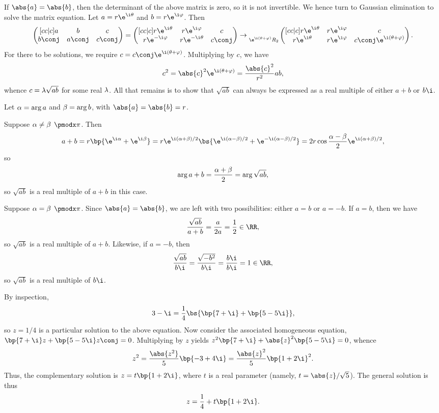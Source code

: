 \begin{solution}
\begin{ppart}
        If $\abs{a} = \abs{b}$, then the determinant of the above matrix is zero, so it is not invertible. We hence turn to Gaussian elimination to solve the matrix equation. Let $a = r\e^{\i \t}$ and $b = r\e^{\i \vf}$. Then \[\begin{pmatrix}[cc|c] a & b & c \\ b\conj & a\conj & c\conj \end{pmatrix} = \begin{pmatrix}[cc|c] r\e^{\i \t} & r\e^{\i \vf} & c \\ r\e^{-\i \vf} & r\e^{-\i \t} & c\conj \end{pmatrix} \rightarrow \begin{matrix}\\ \scriptstyle \e^{\i(\t + \vf)} R_2\end{matrix} \begin{pmatrix}[cc|c] r\e^{\i \t} & r\e^{\i \vf} & c \\ r\e^{\i \t} & r\e^{\i \vf} & c\conj \e^{\i (\t + \vf)} \end{pmatrix}.\] For there to be solutions, we require $c = c\conj \e^{\i (\t + \vf)}$. Multiplying by $c$, we have \[c^2 = \abs{c}^2 \e^{\i (\t + \vf)} = \frac{\abs{c}^2}{r^2} ab,\] whence $c = \lambda \sqrt{ab}$ for some real $\lambda$. All that remains is to show that $\sqrt{ab}$ can always be expressed as a real multiple of either $a + b$ or $b\i$.

        Let $\alpha = \arg{a}$ and $\beta = \arg{b}$, with $\abs{a} = \abs{b} = r$.

         Suppose $\a \neq \b \pmod{\pi}$. Then \[a + b = r\bp{\e^{\i \a} + \e^{\i \b}} = r\e^{\i (\a + \b)/2} \bs{\e^{\i (\a - \b)/2} + \e^{-\i(\a - \b)/2}} = 2r\cos{\frac{\a - \b}{2}}\e^{\i (\a + \b)/2},\] so \[\arg{a + b} = \frac{\alpha + \beta}{2} = \arg{\sqrt{ab}},\] so $\sqrt{ab}$ is a real multiple of $a + b$ in this case.

         Suppose $\a = \b \pmod{\pi}$. Since $\abs{a} = \abs{b}$, we are left with two possibilities: either $a = b$ or $a = -b$. If $a = b$, then we have \[\frac{\sqrt{ab}}{a + b} = \frac{a}{2a} = \frac12 \in \RR,\] so $\sqrt{ab}$ is a real multiple of $a + b$. Likewise, if $a = -b$, then \[\frac{\sqrt{ab}}{b \i} = \frac{\sqrt{-b^2}}{b \i} = \frac{b\i}{b\i} = 1 \in \RR,\] so $\sqrt{ab}$ is a real multiple of $b\i$.
    \end{ppart}
    \begin{ppart}
        By inspection, \[3-\i = \frac14 \bs{\bp{7 + \i} + \bp{5 - 5\i}},\] so $z = 1/4$ is a particular solution to the above equation. Now consider the associated homogeneous equation, $\bp{7 + \i} z + \bp{5 - 5\i} z\conj = 0$. Multiplying by $z$ yields $z^2 \bp{7 + \i} + \abs{z}^2 \bp{5 - 5\i} = 0$, whence \[z^2 = \frac{\abs{z^2}}{5} \bp{-3 + 4\i} = \frac{\abs{z}^2}{5} \bp{1 + 2\i}^2.\] Thus, the complementary solution is $z = t \bp{1 + 2\i}$, where $t$ is a real parameter (namely, $t = \abs{z}/\sqrt{5}$). The general solution is thus \[z = \frac14 + t \bp{1 + 2\i}.\]
    \end{ppart}
\end{solution}


